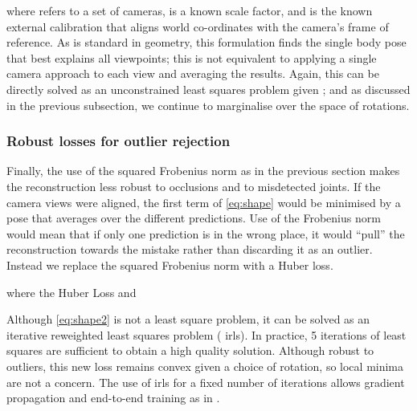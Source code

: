 \documentclass[10pt,twocolumn,letterpaper]{article}
\begin{document}
where  refers to a set of cameras,  is a known scale
factor, and  is the known external calibration that aligns world
co-ordinates with the camera's frame of reference.  As is standard in
geometry, this formulation finds the single body pose that best
explains all viewpoints; this is not equivalent to applying a single
camera approach to each view and averaging the results.
Again, this can be directly solved as an unconstrained least squares problem
given ; and as discussed in the previous subsection, we continue to
marginalise over the space of rotations.
\subsubsection{Robust losses for outlier rejection}
Finally, the use of the squared Frobenius norm as in the previous section makes the
reconstruction less robust to occlusions and to misdetected joints. If the
camera views were aligned, the first term of \eqref{eq:shape} would be minimised
by a pose that averages over the different predictions. Use of the Frobenius
norm would  mean
that if only one prediction is in the wrong place, it would ``pull'' the
reconstruction towards the mistake rather than discarding it as an outlier.
Instead we replace the squared Frobenius norm with a Huber loss.

where the Huber Loss  and 

Although \eqref{eq:shape2} is not  a least square
problem, it can be solved as an iterative reweighted least squares problem ({\sc
irls}). In
practice, 5 iterations of least squares are sufficient to obtain a high quality
solution. Although robust to outliers, this new loss remains convex given a
choice of rotation, so local
minima are not a concern. The use of {\sc irls} for a fixed number of iterations
allows gradient propagation and end-to-end training as in \cite{tome2017lifting}.   
\end{document}
